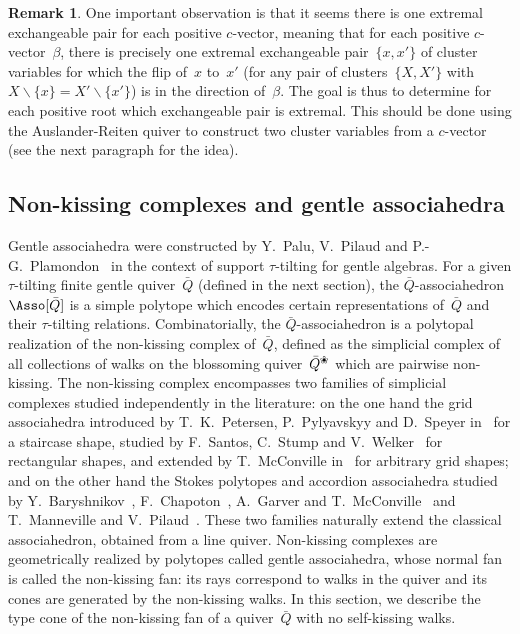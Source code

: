 \documentclass{amsart}
\theoremstyle{definition}
\newtheorem{remark}[theorem]{Remark}
\newcommand{\ssm}{\smallsetminus} %
\newcommand{\quiver}{\bar Q} %
\newcommand{\blossom}{^\text{\ding{96}}} %
\begin{document}
\newpage

\begin{remark}
One important observation is that it seems there is one extremal exchangeable pair for each positive $c$-vector, meaning that for each positive $c$-vector~$\beta$, there is precisely one extremal exchangeable pair~$\{x,x'\}$ of cluster variables for which the flip of~$x$ to~$x'$ (for any pair of clusters~$\{X,X'\}$ with~$X \ssm \{x\} = X' \ssm \{x'\}$) is in the direction of~$\beta$.
The goal is thus to determine for each positive root which exchangeable pair is extremal.
This should be done using the Auslander-Reiten quiver to construct two cluster variables from a $c$-vector (see the next paragraph for the idea).
\end{remark}

\newpage


\subsection{Non-kissing complexes and gentle associahedra}

Gentle associahedra were constructed by Y.~Palu, V.~Pilaud and P.-G.~Plamondon~\cite{PaluPilaudPlamondon-nonkissing} in the context of support $\tau$-tilting for gentle algebras.
For a given $\tau$-tilting finite gentle quiver~$\quiver$ (defined in the next section), the $\quiver$-associahedron~$\Asso[\quiver]$ is a simple polytope which encodes certain representations of~$\quiver$ and their $\tau$-tilting relations.
Combinatorially, the $\quiver$-associahedron is a polytopal realization of the non-kissing complex of~$\quiver$, defined as the simplicial complex of all collections of walks on the blossoming quiver~$\quiver\blossom$ which are pairwise non-kissing.
The non-kissing complex encompasses two families of simplicial complexes studied independently in the literature: on the one hand the grid associahedra introduced by T.~K.~Petersen, P.~Pylyavskyy and D.~Speyer in~\cite{PetersenPylyavskyySpeyer} for a staircase shape, studied by F.~Santos, C.~Stump and V.~Welker~\cite{SantosStumpWelker} for rectangular shapes, and extended by T.~McConville in~\cite{McConville} for arbitrary grid shapes; and on the other hand the Stokes polytopes and accordion associahedra studied by Y.~Baryshnikov~\cite{Baryshnikov}, F.~Chapoton~\cite{Chapoton-quadrangulations}, A.~Garver and T.~McConville~\cite{GarverMcConville} and T.~Manneville and V.~Pilaud~\cite{MannevillePilaud-accordion}.
These two families naturally extend the classical associahedron, obtained from a line quiver.
Non-kissing complexes are geometrically realized by polytopes called gentle associahedra, whose normal fan is called the non-kissing fan: its rays correspond to walks in the quiver and its cones are generated by the non-kissing walks.
In this section, we describe the type cone of the non-kissing fan of a quiver~$\quiver$ with no self-kissing walks.
\end{document}
